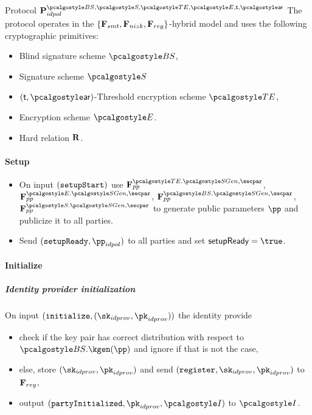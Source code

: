 \documentclass[runningheads,10pt]{llncs}
\numberwithin{equation}{section}
\begin{document}
\begin{protbox}{Protocol $\prot{idpol}^{\BSIG, \SIG, \TENC, \ENC, \thresholdar, \noofar}$}
  The protocol operates in the
  $\{\mathbf{F}_{{smt}}, \mathbf{F}_{{nizk}}, \mathbf{F}_{{reg}}\}$-hybrid model and uses the
  following cryptographic primitives:
  \begin{itemize}
  \item Blind signature scheme $\BSIG$,
  \item Signature scheme $\SIG$
  \item $(\thresholdar, \noofar)$-Threshold encryption scheme $\TENC$,
  \item Encryption scheme $\ENC$.
  \item Hard relation $\mathbf{R}$.
  \end{itemize}

  \paragraph{Setup}
  \begin{itemize}
  \item On input $(\mathtt{setupStart})$ use $\func{pp}^{\TENC.\sgen, \secpar}$,
    $\func{pp}^{\ENC.\sgen, \secpar}$, $\func{pp}^{\BSIG.\sgen, \secpar}$,
    $\func{pp}^{\SIG.\sgen, \secpar}$ to generate public parameters $\pp$ and
    publicize it to all parties.
  \item Send $(\setupReady, \pp_{idpol})$ to all parties and set
    $\flag{setupReady} = \true$.
  \end{itemize}

  \paragraph{Initialize}
  \subparagraph{Identity provider initialization} On input
  $(\initialize, (\sk_{idprov}, \pk_{idprov}))$ the identity provide
  \begin{itemize}
  \item check if the key pair has correct distribution with respect to
    $\BSIG.\kgen(\pp)$ and ignore if that is not the case,
  \item else, store $(\sk_{idprov}, \pk_{idprov})$ and send
    $(\register, \sk_{idprov}, \pk_{idprov})$ to $\mathbf{F}_{{reg}}$,
  \item output $(\partyInitialized, \pk_{idprov}, \idprov)$ to $\idprov$.
  \end{itemize}



\end{protbox}
\end{document}
